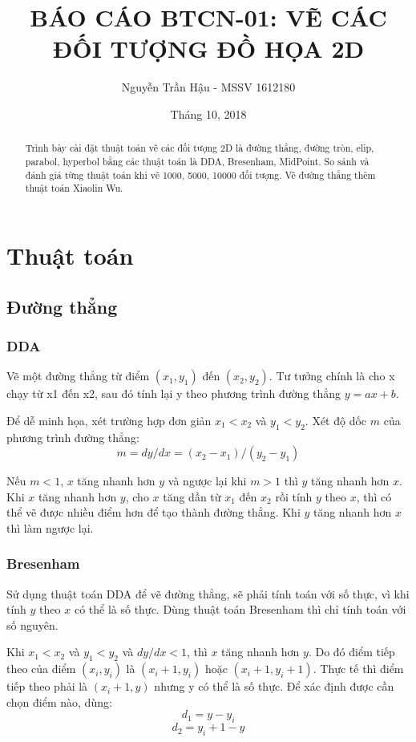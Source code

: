 \documentclass[12pt]{article}
\title{BÁO CÁO BTCN-01: VẼ CÁC ĐỐI TƯỢNG ĐỒ HỌA 2D}
\author{Nguyễn Trần Hậu - MSSV 1612180}
\date{Tháng 10, 2018}
\begin{document}
\maketitle
\newpage
\tableofcontents
\newpage

\begin{abstract}
Trình bày cài đặt thuật toán vẽ các đối tượng 2D là
đường thẳng, đường tròn, elip, parabol, hyperbol
bằng các thuật toán là DDA, Bresenham, MidPoint.
So sánh và đánh giá từng thuật toán khi vẽ 1000, 5000, 10000 đối tượng.
Vẽ đường thẳng thêm thuật toán Xiaolin Wu.
\end{abstract}

\section{Thuật toán}

\subsection{Đường thẳng}

\subsubsection{DDA}
Vẽ một đường thẳng từ điểm \((x_1, y_1)\) đến \((x_2, y_2)\).
Tư tưởng chính là cho x chạy từ x1 đến x2,
sau đó tính lại y theo phương trình đường thẳng \(y=ax+b\).

Để dễ minh họa, xét trường hợp đơn giản \(x_1 < x_2\) và \(y_1 < y_2\).
Xét độ dốc \(m\) của phương trình đường thẳng:
\[m = dy/dx = (x_2 - x_1)/(y_2 - y_1)\]

Nếu \(m < 1\), \(x\) tăng nhanh hơn \(y\) và
ngược lại khi \(m > 1\) thì \(y\) tăng nhanh hơn \(x\).
Khi \(x\) tăng nhanh hơn \(y\), cho \(x\) tăng dần từ \(x_1\) đến \(x_2\)
rồi tính \(y\) theo \(x\), thì có thể vẽ được nhiều điểm hơn để tạo thành đường thẳng.
Khi \(y\) tăng nhanh hơn \(x\) thì làm ngược lại.

\subsubsection{Bresenham}
Sử dụng thuật toán DDA để vẽ đường thẳng, sẽ phải tính toán với số thực,
vì khi tính \(y\) theo \(x\) có thể là số thực.
Dùng thuật toán Bresenham thì chỉ tính toán với số nguyên.

Khi \(x_1 < x_2\) và \(y_1 < y_2\) và \(dy/dx < 1\),
thì \(x\) tăng nhanh hơn \(y\).
Do đó điểm tiếp theo của điểm \((x_i, y_i)\)
là \((x_i + 1, y_i)\) hoặc \((x_i + 1, y_i + 1)\).
Thực tế thì điểm tiếp theo phải là \((x_i + 1, y)\) nhưng y có thể là số thực.
Để xác định được cần chọn điểm nào, dùng:
\[d_1 = y - y_i\]
\[d_2 = y_i + 1 - y\]
\end{document}
